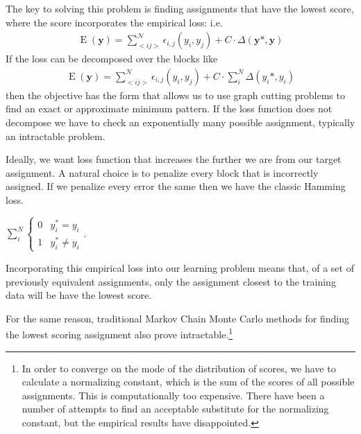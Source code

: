 The key to solving this problem is finding assignments that have the
lowest score, where the score incorporates the empirical loss: i.e.
%
\begin{align}
\operatorname{E}(\mathbf{y}) = \sum_{<i j>}^{\mathcal{N}}\epsilon_{i,j}(y_i,y_j) + C\cdot\Delta(\mathbf{y}*,
\mathbf{y})
\end{align}
%
If the loss can be decomposed over the blocks like
%
\begin{align}
\operatorname{E}(\mathbf{y}) = \sum_{<i j>}^{\mathcal{N}}\epsilon_{i,j}(y_i,y_j) + C\cdot\sum_i^N\Delta(y_i*, y_i)
\end{align}
%
then the objective has the form that allows us to use graph cutting
problems to find an exact or approximate minimum pattern. If the
loss function does not decompose we have to check an exponentially
many possible assignment, typically an intractable problem.

Ideally, we want loss function that increases the further we are from our
target assignment. A natural choice is to penalize every block that is
incorrectly assigned. If we penalize every error the same then we have
the classic Hamming loss. 

$\sum_i^N\begin{cases}
  0 &y_i^* = y_i \\
  1 &y_i^* \neq y_i
\end{cases}$. 

Incorporating this empirical loss into our learning problem means
that, of a set of previously equivalent assignments, only the
assignment closest to the training data will be have the lowest score.


For the same reason, traditional Markov Chain Monte Carlo
methods for finding the lowest scoring assignment also prove
intractable.\footnote{In order to converge on the mode of the
  distribution of scores, we have to calculate a normalizing constant,
  which is the sum of the scores of all possible assignments. This is
  computationally too expensive. There have been a number of attempts
  to find an acceptable substitute for the normalizing constant, but
  the empirical results have disappointed.\cite{li_mrf_2009}}
